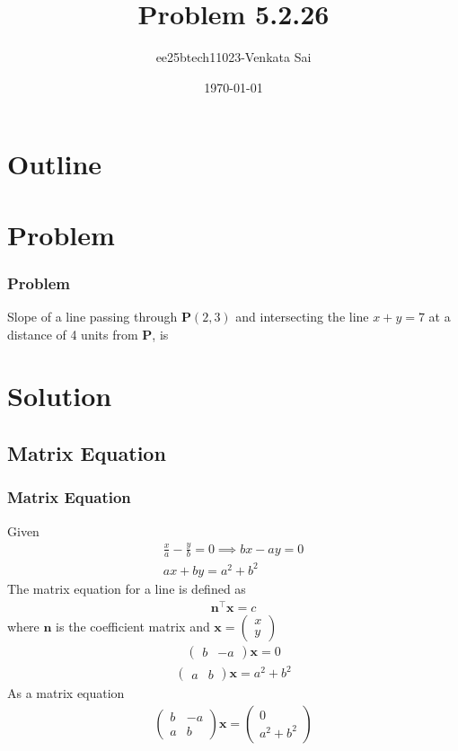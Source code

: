 \documentclass{beamer}
\title{Problem 5.2.26}
\author{ee25btech11023-Venkata Sai}
\date{\today}
\providecommand{\brak}[1]{\ensuremath{\left(#1\right)}}
\theoremstyle{remark}
\newcommand{\myvec}[1]{\ensuremath{\begin{pmatrix}#1\end{pmatrix}}}
\let\vec\mathbf
\numberwithin{equation}{section}
\begin{document}
\begin{frame}
\titlepage
\end{frame}

\section*{Outline}
\begin{frame}
\tableofcontents
\end{frame}

\section{Problem}

\begin{frame}
\frametitle{Problem}
\setcounter{section}{1}
Slope of a line passing through $\vec{P}\brak{2,3}$ and intersecting the line $x+y=7$ at a distance of 4 units from $\vec{P}$, is
\end{frame}
\section{Solution}

\subsection{Matrix Equation}
\begin{frame}
\frametitle{Matrix Equation}
Given  
\begin{align}
\frac{x}{a}-\frac{y}{b}=0 \implies bx-ay=0 \\
ax+by=a^{2}+b^{2} 
\end{align}
The matrix equation for a line is defined as
\begin{align}
    \vec{n}^\top\vec{x}=c
\end{align}
where $\vec{n}$ is the coefficient matrix and $\vec{x}=\myvec{x\\y}$
\begin{align}
    \myvec{b&-a}\vec{x}=0
    \end{align}
    \begin{align}
    \myvec{a&b}\vec{x}=a^{2}+b^{2} 
\end{align}
As a matrix equation
\begin{align}
 \myvec{b&-a\\a&b}\vec{x}=\myvec{0\\a^{2}+b^{2}} 
  \end{align}
\end{frame}
\end{document}
